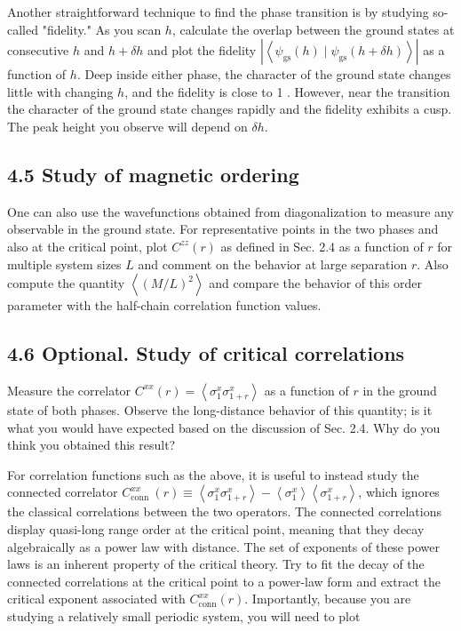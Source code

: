 \documentclass[12pt]{article}
\begin{document}
Another straightforward technique to find the phase transition is by studying so-called "fidelity." As you scan $h$, calculate the overlap between the ground states at consecutive $h$ and $h+\delta h$ and plot the fidelity $\left|\left\langle\psi_{\mathrm{gs}}(h) \mid \psi_{\mathrm{gs}}(h+\delta h)\right\rangle\right|$ as a function of $h$. Deep inside either phase, the character of the ground state changes little with changing $h$, and the fidelity is close to 1 . However, near the transition the character of the ground state changes rapidly and the fidelity exhibits a cusp. The peak height you observe will depend on $\delta h$.

\subsection*{4.5 Study of magnetic ordering}
One can also use the wavefunctions obtained from diagonalization to measure any observable in the ground state. For representative points in the two phases and also at the critical point, plot $C^{z z}(r)$ as defined in Sec. 2.4 as a function of $r$ for multiple system sizes $L$ and comment on the behavior at large separation $r$. Also compute the quantity $\left\langle(M / L)^{2}\right\rangle$ and compare the behavior of this order parameter with the half-chain correlation function values.

\subsection*{4.6 Optional. Study of critical correlations}
Measure the correlator $C^{x x}(r)=\left\langle\sigma_{1}^{x} \sigma_{1+r}^{x}\right\rangle$ as a function of $r$ in the ground state of both phases. Observe the long-distance behavior of this quantity; is it what you would have expected based on the discussion of Sec. 2.4. Why do you think you obtained this result?

For correlation functions such as the above, it is useful to instead study the connected correlator $C_{\text {conn }}^{x x}(r) \equiv\left\langle\sigma_{1}^{x} \sigma_{1+r}^{x}\right\rangle-\left\langle\sigma_{1}^{x}\right\rangle\left\langle\sigma_{1+r}^{x}\right\rangle$, which ignores the classical correlations between the two operators. The connected correlations display quasi-long range order at the critical point, meaning that they decay algebraically as a power law with distance. The set of exponents of these power laws is an inherent property of the critical theory. Try to fit the decay of the connected correlations at the critical point to a power-law form and extract the critical exponent associated with $C_{\operatorname{conn}}^{x x}(r)$. Importantly, because you are studying a relatively small periodic system, you will need to plot
\end{document}
